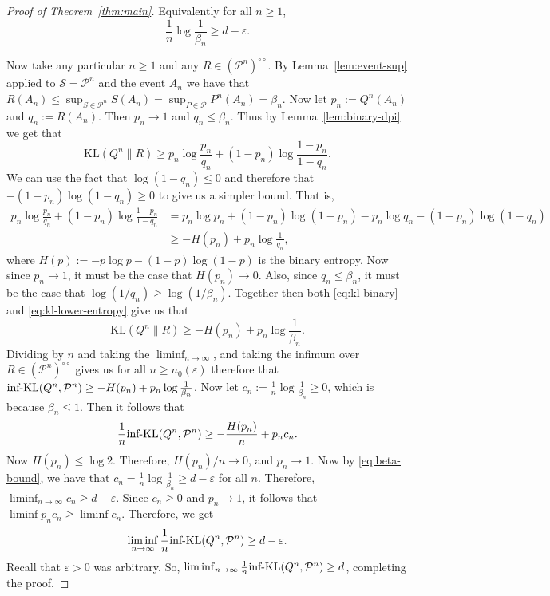 \documentclass[11pt]{article}
\newcommand{\KL}{\mathrm{KL}}
\newcommand{\infKL}{\textnormal{inf-KL}}
\newcommand{\Pcal}{\mathcal{P}}
\theoremstyle{definition}
\theoremstyle{definition}
\begin{document}
\begin{proof}[Proof of Theorem~\ref{thm:main}]
\noindent Equivalently for all $n\ge 1$, 
\begin{equation}\label{eq:beta-bound}
\frac1n\log\frac1{\beta_n}\ge d-\varepsilon.    
\end{equation}

\noindent Now take any particular $n\ge1$ and any $R\in(\Pcal^n)^{\circ\circ}$. By Lemma~\ref{lem:event-sup} applied to $\mathcal{S}=\Pcal^n$ and the event $A_n$ we have that $R(A_n)\le \sup_{S\in\Pcal^n} S(A_n)=\sup_{P\in\Pcal}P^n(A_n)=\beta_n$. Now let $p_n:=Q^n(A_n)$ and $q_n:=R(A_n)$. Then $p_n\to 1$ and $q_n\le \beta_n$. Thus by Lemma~\ref{lem:binary-dpi} we get that
\begin{equation}\label{eq:kl-binary}
\KL(Q^n\|R)\ge p_n\log\frac{p_n}{q_n}+(1-p_n)\log\frac{1-p_n}{1-q_n}.   
\end{equation}
We can use the fact that $\log(1-q_n)\le 0$ and therefore that $-(1-p_n)\log(1-q_n)\ge 0$ to give us a simpler bound. That is,
\begin{align}
p_n\log\frac{p_n}{q_n}+(1-p_n)\log\frac{1-p_n}{1-q_n} &=p_n\log p_n + (1-p_n)\log(1-p_n)-p_n\log q_n-(1-p_n)\log(1-q_n)\nonumber\\
&\ge -H(p_n)+p_n\log\frac{1}{q_n},\label{eq:kl-lower-entropy}
\end{align}
where $H(p):=-p\log p-(1-p)\log(1-p)$ is the binary entropy. Now since $p_n\to 1$, it must be the case that $H(p_n)\to 0$. Also, since $q_n\le \beta_n$, it must be the case that $\log(1/q_n)\ge \log(1/\beta_n)$. Together then both \eqref{eq:kl-binary} and \eqref{eq:kl-lower-entropy} give us that
\[
\KL(Q^n\|R)\ge -H(p_n)+p_n\log\frac{1}{\beta_n}.
\]
Dividing by $n$ and taking the $\liminf_{n\to\infty}$, and taking the infimum over $R\in(\Pcal^n)^{\circ\circ}$ gives us for all $n\ge n_0(\varepsilon)$ therefore that $\infKL(Q^n, \Pcal^n)\ge -H(p_n)+p_n\log\frac{1}{\beta_n}$. Now let $c_n:=\frac1n\log\frac1{\beta_n}\ge 0$, which is because $\beta_n\le 1$. Then it follows that
\[
\frac1n\infKL(Q^n,\Pcal^n)\ge -\frac{H(p_n)}{n}+p_n c_n.
\]
Now $H(p_n)\le \log 2$. Therefore, $H(p_n)/n\to0$, and $p_n\to 1$. Now by \eqref{eq:beta-bound}, we have that $c_n=\frac1n\log\frac1{\beta_n}\ge d-\varepsilon$ for all $n$. Therefore, $\liminf_{n\to\infty} c_n\ge d-\varepsilon$. Since $c_n\ge 0$ and $p_n\to 1$, it follows that $\liminf p_nc_n \ge \liminf c_n$. Therefore, we get
\[
\liminf_{n\to\infty}\frac1n\infKL(Q^n,\Pcal^n)\ge d-\varepsilon.
\]
Recall that $\varepsilon>0$ was arbitrary. So, $\liminf_{n\to\infty}\frac{1}{n}\infKL(Q^n, \Pcal^n)\ge d$, completing the proof.
\end{proof}
\end{document}
